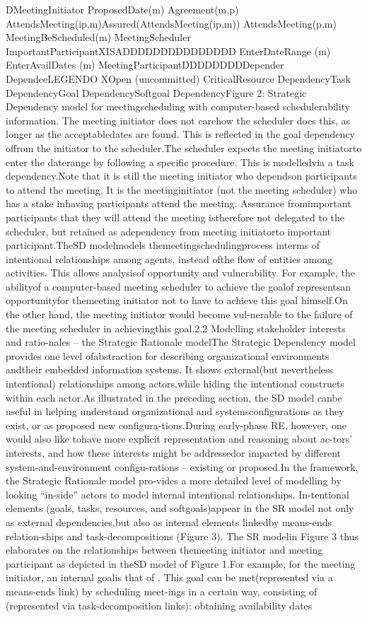 DMeetingInitiator ProposedDate(m) Agreement(m,p)  AttendsMeeting(ip,m)Assured(AttendsMeeting(ip,m))  AttendsMeeting(p,m) MeetingBeScheduled(m) MeetingScheduler ImportantParticipantXISADDDDDDDDDDDDDDD    EnterDateRange     (m)    EnterAvailDates     (m)   MeetingParticipantDDDDDDDDDepender DependeeLEGENDO  XOpen (uncommitted) CriticalResource DependencyTask DependencyGoal DependencySoftgoal DependencyFigure 2: Strategic Dependency model for meetingscheduling with computer-based schedulerability information. The meeting initiator does not carehow the scheduler does this, as longer as the acceptabledates are found. This is reﬂected in the goal dependency offrom the initiator to the scheduler.The scheduler expects the meeting initiatorto enter the daterange by following a speciﬁc procedure. This is modelledvia a task dependency.Note that it is still the meeting initiator who dependson participants to attend the meeting. It is the meetinginitiator (not the meeting scheduler) who has a stake inhaving participants attend the meeting. Assurance fromimportant participants that they will attend the meeting istherefore not delegated to the scheduler, but retained as adependency from meeting initiatorto important participant.TheSD modelmodels themeetingschedulingprocess interms of intentional relationships among agents, instead ofthe ﬂow of entities among activities. This allows analysisof opportunity and vulnerability. For example, the abilityof a computer-based meeting scheduler to achieve the goalof representsan opportunityfor themeeting initiator not to have to achieve this goal himself.On the other hand, the meeting initiator would become vul-nerable to the failure of the meeting scheduler in achievingthis goal.2.2 Modelling stakeholder interests and ratio-nales – the Strategic Rationale modelThe Strategic Dependency model provides one level ofabstraction for describing organizational environments andtheir embedded information systems. It shows external(but nevertheless intentional) relationships among actors,while hiding the intentional constructs within each actor.As illustrated in the preceding section, the SD model canbe useful in helping understand organizational and systemsconﬁgurations as they exist, or as proposed new conﬁgura-tions.During early-phase RE, however, one would also like tohave more explicit representation and reasoning about ac-tors’ interests, and how these interests might be addressedor impacted by different system-and-environment conﬁgu-rations – existing or proposed.In the framework, the Strategic Rationale model pro-vides a more detailed level of modelling by looking “in-side” actors to model internal intentional relationships. In-tentional elements (goals, tasks, resources, and softgoals)appear in the SR model not only as external dependencies,but also as internal elements linkedby means-ends relation-ships and task-decompositions (Figure 3). The SR modelin Figure 3 thus elaborates on the relationships between themeeting initiator and meeting participant as depicted in theSD model of Figure 1.For example, for the meeting initiator, an internal goalis that of . This goal can be met(represented via a means-ends link) by scheduling meet-ings in a certain way, consisting of (represented via task-decomposition links): obtaining availability dates 